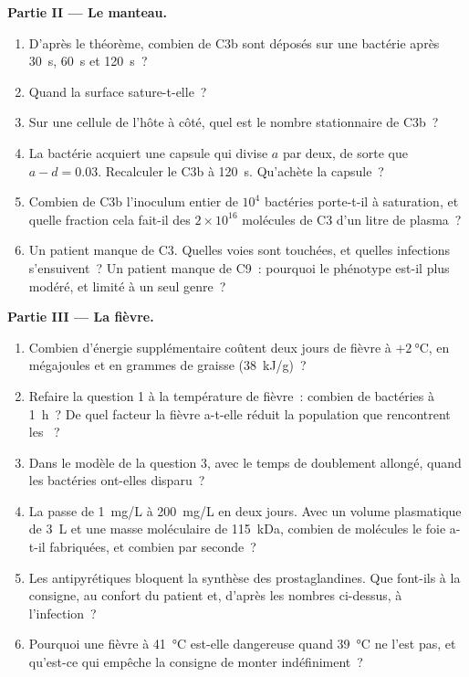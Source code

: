 \begin{problem}
\medskip
\noindent\textbf{Partie II --- Le manteau.}
\begin{enumerate}[resume]
  \item D'après le théorème, combien de C3b sont déposés sur une
        bactérie après \qty{30}{s}, \qty{60}{s} et \qty{120}{s}~?
  \item Quand la surface sature-t-elle~?
  \item Sur une cellule de l'hôte à côté, quel est le nombre
        stationnaire de C3b~?
  \item La bactérie acquiert une capsule qui divise $a$ par deux, de
        sorte que $a -
        d = 0.03$. Recalculer le C3b à \qty{120}{s}. Qu'achète la
        capsule~?
  \item Combien de C3b l'inoculum entier de $10^{4}$ bactéries
        porte-t-il à saturation, et quelle fraction cela fait-il des
        $2\times 10^{16}$ molécules de C3 d'un litre de plasma~?
  \item Un patient manque de C3. Quelles voies sont touchées, et quelles
        infections s'ensuivent~? Un patient manque de C9~: pourquoi le
        phénotype est-il plus modéré, et limité à un seul genre~?
\end{enumerate}

\medskip
\noindent\textbf{Partie III --- La fièvre.}
\begin{enumerate}[resume]
  \item Combien d'énergie supplémentaire coûtent deux jours de fièvre à
        $+\qty{2}{\celsius}$, en mégajoules et en grammes de graisse
        (\qty{38}{kJ/g})~?
  \item Refaire la question 1 à la température de fièvre~: combien de
        bactéries à \qty{1}{h}~? De quel facteur la fièvre a-t-elle
        réduit la population que rencontrent les ~?
  \item Dans le modèle de la question 3, avec le temps de doublement
        allongé, quand les bactéries ont-elles disparu~?
  \item La  passe de \qty{1}{mg/L} à \qty{200}{mg/L}
        en deux jours. Avec un volume plasmatique de \qty{3}{L} et une
        masse moléculaire de \qty{115}{kDa}, combien de molécules le
        foie a-t-il fabriquées, et combien par seconde~?
  \item Les antipyrétiques bloquent la synthèse des prostaglandines. Que
        font-ils à la consigne, au confort du patient et, d'après les
        nombres ci-dessus, à l'infection~?
  \item Pourquoi une fièvre à \qty{41}{\celsius} est-elle dangereuse
        quand \qty{39}{\celsius} ne l'est pas, et qu'est-ce qui empêche
        la consigne de monter indéfiniment~?
\end{enumerate}


\end{problem}
